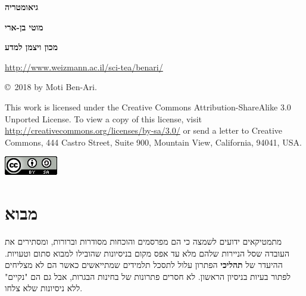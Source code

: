 \documentclass[12pt,a4paper]{article}
\begin{document}

\thispagestyle{empty}

\begin{center}
\textbf{\Huge גיאומטריה}

\bigskip
\bigskip
\bigskip

\textbf{\Large מוטי בן-ארי}

\bigskip

\textbf{\Large מכון ויצמן למדע}

\bigskip

\url{http://www.weizmann.ac.il/sci-tea/benari/}

\bigskip

\end{center}


\vfill

\begin{center}
\sffamily\copyright{}\  2018 by Moti Ben-Ari.
\end{center}

\begin{footnotesize}
\sffamily
This work is licensed under the Creative Commons Attribution-ShareAlike 3.0 Unported License. To view a copy of this license, visit \url{http://creativecommons.org/licenses/by-sa/3.0/} or send a letter to Creative Commons, 444 Castro Street, Suite 900, Mountain View, California, 94041, USA.
\end{footnotesize}

\begin{center}
\includegraphics[width=.2\textwidth]{../../by-sa.png}
\end{center}

\newpage
{}

\tableofcontents

\newpage


\section{מבוא}

מתמטיקאים ידועים לשמצה כי הם מפרסמים והוכחות מסודרות וברורות, ומסתירים את העובדה שסל הניירות שלהם מלא עד אפס מקום בניסיונות שהובילו למבוא סתום וטעויות. ההיעדר של 
\textbf{תהליכי}
הפתרון עלול לתסכל תלמידים שמתייאשים כאשר הם לא מצליחים לפתור בעיות בניסיון הראשון. לא חסרים פתרונות של בחינות הבגרות, אבל גם הם "נקיים" ללא ניסיונות שלא צלחו.
\end{document}
